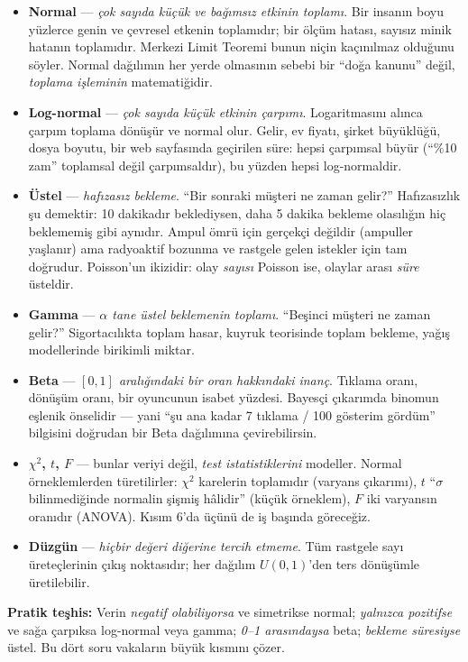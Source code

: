 \documentclass[11pt,a4paper]{article}
\begin{document}
{\begin{itemize}\itemsep2pt
\item \textbf{Normal} --- \emph{çok sayıda küçük ve bağımsız etkinin
toplamı}. Bir insanın boyu yüzlerce genin ve çevresel etkenin toplamıdır; bir
ölçüm hatası, sayısız minik hatanın toplamıdır. Merkezi Limit Teoremi bunun
niçin kaçınılmaz olduğunu söyler. Normal dağılımın her yerde olmasının sebebi
bir ``doğa kanunu'' değil, \emph{toplama işleminin} matematiğidir.
\item \textbf{Log-normal} --- \emph{çok sayıda küçük etkinin çarpımı}.
Logaritmasını alınca çarpım toplama dönüşür ve normal olur. Gelir, ev
fiyatı, şirket büyüklüğü, dosya boyutu, bir web sayfasında geçirilen süre:
hepsi çarpımsal büyür (``\%10 zam'' toplamsal değil çarpımsaldır), bu yüzden
hepsi log-normaldir.
\item \textbf{Üstel} --- \emph{hafızasız bekleme}. ``Bir sonraki müşteri ne
zaman gelir?'' Hafızasızlık şu demektir: 10 dakikadır beklediysen, daha
5 dakika bekleme olasılığın hiç beklememiş gibi aynıdır. Ampul ömrü için
gerçekçi değildir (ampuller yaşlanır) ama radyoaktif bozunma ve rastgele
gelen istekler için tam doğrudur. Poisson'un ikizidir: olay \emph{sayısı}
Poisson ise, olaylar arası \emph{süre} üsteldir.
\item \textbf{Gamma} --- \emph{$\alpha$ tane üstel beklemenin toplamı}.
``Beşinci müşteri ne zaman gelir?'' Sigortacılıkta toplam hasar, kuyruk
teorisinde toplam bekleme, yağış modellerinde birikimli miktar.
\item \textbf{Beta} --- \emph{$[0,1]$ aralığındaki bir oran hakkındaki
inanç}. Tıklama oranı, dönüşüm oranı, bir oyuncunun isabet yüzdesi. Bayesçi
çıkarımda binomun eşlenik önselidir --- yani ``şu ana kadar 7 tıklama /
100 gösterim gördüm'' bilgisini doğrudan bir Beta dağılımına çevirebilirsin.
\item \textbf{$\chi^2$, $t$, $F$} --- bunlar veriyi değil, \emph{test
istatistiklerini} modeller. Normal örneklemlerden türetilirler:
$\chi^2$ karelerin toplamıdır (varyans çıkarımı), $t$ ``$\sigma$ bilinmediğinde
normalin şişmiş hâlidir'' (küçük örneklem), $F$ iki varyansın oranıdır
(ANOVA). Kısım 6'da üçünü de iş başında göreceğiz.
\item \textbf{Düzgün} --- \emph{hiçbir değeri diğerine tercih etmeme}. Tüm
rastgele sayı üreteçlerinin çıkış noktasıdır; her dağılım $U(0,1)$'den ters
dönüşümle üretilebilir.
\end{itemize}

\textbf{Pratik teşhis:} Verin \emph{negatif olabiliyorsa} ve simetrikse
normal; \emph{yalnızca pozitifse} ve sağa çarpıksa log-normal veya gamma;
\emph{0--1 arasındaysa} beta; \emph{bekleme süresiyse} üstel. Bu dört soru
vakaların büyük kısmını çözer.}
\end{document}
